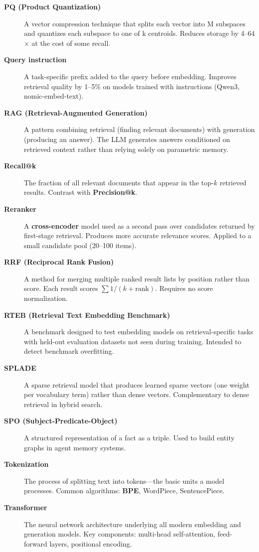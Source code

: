 \begin{description}
\item[\textbf{PQ (Product Quantization)}]
A vector compression technique that splits each vector into M subspaces and quantizes each
subspace to one of k centroids. Reduces storage by 4--64$\times$ at the cost of some recall.

\item[\textbf{Query instruction}]
A task-specific prefix added to the query before embedding. Improves retrieval quality by
1--5\% on models trained with instructions (Qwen3, nomic-embed-text).

\item[\textbf{RAG (Retrieval-Augmented Generation)}]
A pattern combining retrieval (finding relevant documents) with generation (producing an
answer). The LLM generates answers conditioned on retrieved context rather than relying
solely on parametric memory.

\item[\textbf{Recall@k}]
The fraction of all relevant documents that appear in the top-$k$ retrieved results.
Contrast with \textbf{Precision@k}.

\item[\textbf{Reranker}]
A \textbf{cross-encoder} model used as a second pass over candidates returned by first-stage
retrieval. Produces more accurate relevance scores. Applied to a small candidate pool
(20--100 items).

\item[\textbf{RRF (Reciprocal Rank Fusion)}]
A method for merging multiple ranked result lists by position rather than score. Each result
scores $\sum 1 / (k + \text{rank})$. Requires no score normalization.

\item[\textbf{RTEB (Retrieval Text Embedding Benchmark)}]
A benchmark designed to test embedding models on retrieval-specific tasks with held-out
evaluation datasets not seen during training. Intended to detect benchmark overfitting.

\item[\textbf{SPLADE}]
A sparse retrieval model that produces learned sparse vectors (one weight per vocabulary
term) rather than dense vectors. Complementary to dense retrieval in hybrid search.

\item[\textbf{SPO (Subject-Predicate-Object)}]
A structured representation of a fact as a triple. Used to build entity graphs in agent
memory systems.

\item[\textbf{Tokenization}]
The process of splitting text into tokens---the basic units a model processes. Common
algorithms: \textbf{BPE}, WordPiece, SentencePiece.

\item[\textbf{Transformer}]
The neural network architecture underlying all modern embedding and generation models.
Key components: multi-head self-attention, feed-forward layers, positional encoding.

\end{description}
